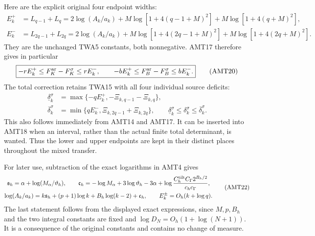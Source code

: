 \documentclass[11pt,a4paper]{article}
\begin{document}
Here are the explicit original four endpoint widths:
\[
\begin{split}
 E_k^+&=L_{q-1}+L_q
   =2\log(A_k/a_k)+M\log[1+4(q-1+M)^2]
                         +M\log[1+4(q+M)^2],\\
 E_k^-&=L_{2q-1}+L_{2q}
   =2\log(A_k/a_k)+M\log[1+4(2q-1+M)^2]
                         +M\log[1+4(2q+M)^2].
\end{split}\tag{AMT19}
\]
They are the unchanged TWA5 constants, both nonnegative. AMT17
therefore gives in particular
\[
 \boxed{-rE_k^+\le F_K^{\rm ar}-F_K^\sigma\le rE_k^-,\qquad
        -bE_k^+\le F_B^{\rm ar}-F_B^\sigma\le bE_k^-.}
 \tag{AMT20}
\]
The total correction retains TWA15 with all four individual source
deficits:
\[
\begin{split}
 \underline\delta_k^\sigma
   &=\max\{-qE_k^+,-\Xi_{k,q-1}-\Xi_{k,q}\},\\
 \overline\delta_k^\sigma
   &=\min\{qE_k^-,\Xi_{k,2q-1}+\Xi_{k,2q}\},\qquad
 \underline\delta_k^\sigma\le\delta_k^\sigma\le\overline\delta_k^\sigma.
\end{split}\tag{AMT21}
\]
This also follows immediately from AMT14 and AMT17. It can be
inserted into AMT18 when an interval, rather than the actual finite
total determinant, is wanted. Thus the lower and upper endpoints
are kept in their distinct places throughout the mixed transfer.

For later use, subtraction of the exact logarithms in AMT4 gives
\[
\begin{gathered}
 \mathfrak s_h=\alpha+\log(M_\alpha/\vartheta_h),\qquad
 \mathfrak c_h=-\log M_\alpha+3\log\vartheta_h-3\alpha
       +\log\frac{C_h^{\rm tilt}C_\Gamma2^{B_h/2}}{c_hc_\Gamma},\\
 \log(A_k/a_k)=k\mathfrak s_h+(p+1)\log k
                         +B_h\log(k-2)+\mathfrak c_h,\qquad
 E_k^\pm=O_h(k+\log q).
\end{gathered}\tag{AMT22}
\]
The last statement follows from the displayed exact expressions,
since $M,p,B_h$ and the two integral constants are fixed and
$\log D_N=O_h(1+\log(N+1))$. It is a consequence of the original
constants and contains no change of measure.
\end{document}
